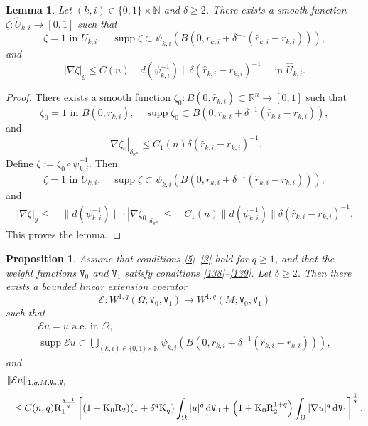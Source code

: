 \documentclass[reqno, 11pt, a4paper]{amsart}
\newtheorem{proposition}[theorem]{Proposition}
\newtheorem{lemma}[theorem]{Lemma}
\numberwithin{equation}{section}
\newcommand{\ck}{\textnormal K}
\newcommand{\spt}{\operatorname{supp}}
\newcommand{\wghtv}{\mathtt{V}}
\newcommand{\dwv}{\textnormal{d} \mathtt{V}}
\newcommand{\rd}{\textnormal{R}}
\newcommand{\mec}{\delta_{\mathbb{R}^n}}
\newcommand{\qxp}{q}
\newcommand{\bnorm}{\boldsymbol{\|}}
\begin{document}
 

\begin{lemma} \label{6}
Let $(k,i)\in \{0,1\}\times \mathbb{N}$ and $\delta \geq 2$. There exists a smooth function $\zeta : \hat U_{k,i} \rightarrow [0,1]$ such that
$$
\zeta = 1 \text { in } U_{k,i}, \quad \spt \zeta \subset \psi_{k,i}\left(B\left(0,r_{k,i}+\delta^{-1}(\hat r_{k,i}-r_{k,i})\right)\right),
$$
and
$$
|\nabla \zeta|_g \leq C(n)\bnorm d(\psi_{k,i}^{-1})\bnorm\delta(\hat r_{k,i}-r_{k,i})^{-1} \quad \text { in } \hat U_{k,i}.
$$
\end{lemma}

\begin{proof}
There exists a smooth function $\zeta_0:B(0,\hat r_{k,i})\subset\mathbb R^n\rightarrow[0,1]$ such that
$$
\zeta_0=1 \text { in } B(0,r_{k,i}), \quad \spt\zeta_0\subset B\left(0,r_{k,i}+\delta^{-1}(\hat r_{k,i}-r_{k,i})\right),
$$
and
$$
|\nabla\zeta_0|_{\mec}\leq C_1(n)\delta(\hat r_{k,i}-r_{k,i})^{-1}.
$$
Define $\zeta:=\zeta_0\circ\psi_{k,i}^{-1}$. Then
$$
\zeta=1 \text { in } U_{k,i}, \quad \spt\zeta\subset\psi_{k,i}\left(B\left(0,r_{k,i}+\delta^{-1}(\hat r_{k,i}-r_{k,i})\right)\right),
$$
and
\begin{equation*}
\begin{aligned}
|\nabla\zeta|_g
\leq &\,\displaystyle \bnorm d(\psi_{k,i}^{-1})\bnorm\cdot|\nabla\zeta_0|_{\mec}\
\leq &\,\displaystyle C_1(n)\bnorm d(\psi_{k,i}^{-1})\bnorm\delta(\hat r_{k,i}-r_{k,i})^{-1}.
\end{aligned}
\end{equation*}
This proves the lemma.
\end{proof}

\begin{proposition} \label{22}
Assume that conditions \ref{5}--\ref{3} hold for $\qxp\geq1$, and that the weight functions $\wghtv_0$ and $\wghtv_1$ satisfy conditions \ref{138}--\ref{139}. Let $\delta\geq2$. Then there exists a bounded linear \textnormal{extension operator}
$$
\mathcal E:W^{1,\qxp}(\Omega;\wghtv_0,\wghtv_1)\rightarrow W^{1,\qxp}(M;\wghtv_0,\wghtv_1)
$$
such that
\begin{gather*}
\mathcal Eu=u \text { a.e. in } \Omega,\\[5pt]
\spt\mathcal Eu\subset\bigcup_{(k,i)\in\{0,1\}\times\mathbb N}\psi_{k,i}\left(B\left(0,r_{k,i}+\delta^{-1}(\hat r_{k,i}-r_{k,i})\right)\right),
\end{gather*}
and
\begin{equation}\label{9}
\begin{aligned}
\|\mathcal Eu&\|_{1,\qxp,M,\wghtv_0,\wghtv_1}\\[3pt]
\leq &\,\displaystyle C(n,\qxp)\rd_1^{\frac{q-1}{q}}\left[(1+\ck_0\rd_2)(1+\delta^{\qxp}\ck_{\qxp})\int_\Omega|u|^{\qxp}\,\dwv_0
+\left(1+\ck_0\rd_2^{1+\qxp}\right)\int_\Omega|\nabla u|^{\qxp}\,\dwv_1\right]^{\frac1\qxp}.
\end{aligned}
\end{equation}
\end{proposition}
\end{document}
